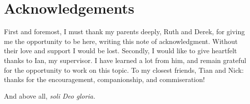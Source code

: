 \chapter{Acknowledgements}

First and foremost, I must thank my parents deeply, Ruth and Derek, for giving me the opportunity to be here, writing this note of acknowledgment.
Without their love and support I would be lost.
Secondly, I would like to give heartfelt thanks to Ian, my supervisor.
I have learned a lot from him, and remain grateful for the opportunity to work on this topic.
To my closest friends, Tian and Nick: thanks for the encouragement, companionship, and commiseration!

And above all, \emph{soli Deo gloria.}
